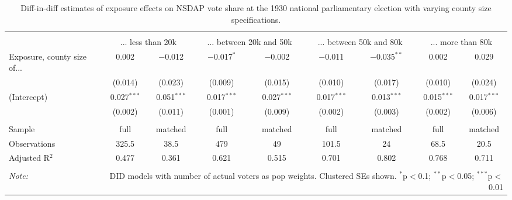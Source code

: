 
\begin{table}[!htbp] \centering 
  \caption{Diff-in-diff estimates of exposure effects on NSDAP vote share at the 1930 national parliamentary election with varying county size specifications.\vspace{-.25cm}} 
  \label{tab:nsdap-voteshare-countysize-dd-1930} 
\scriptsize 
\begin{tabular}{@{\extracolsep{5pt}}lcccccccc} 
\\[-1.8ex]\hline 
\hline \\[-1.8ex] 
 & \multicolumn{2}{c}{... less than 20k } & \multicolumn{2}{c}{... between 20k and 50k} & \multicolumn{2}{c}{... between 50k and 80k} & \multicolumn{2}{c}{... more than 80k} \\ 
 \cmidrule(r){2-3}\cmidrule(r){4-5}\cmidrule(r){6-7}\cmidrule(r){8-9}Exposure, county size of... & 0.002 & $-$0.012 & $-$0.017$^{*}$ & $-$0.002 & $-$0.011 & $-$0.035$^{**}$ & 0.002 & 0.029 \\ 
  & (0.014) & (0.023) & (0.009) & (0.015) & (0.010) & (0.017) & (0.010) & (0.024) \\ 
  (Intercept) & 0.027$^{***}$ & 0.051$^{***}$ & 0.017$^{***}$ & 0.027$^{***}$ & 0.017$^{***}$ & 0.013$^{***}$ & 0.015$^{***}$ & 0.017$^{***}$ \\ 
  & (0.002) & (0.011) & (0.001) & (0.009) & (0.002) & (0.003) & (0.002) & (0.006) \\ 
 \hline \\[-1.8ex] 
Sample & full & matched & full & matched & full & matched & full & matched \\ 
Observations & 325.5 & 38.5 & 479 & 49 & 101.5 & 24 & 68.5 & 20.5 \\ 
Adjusted R$^{2}$ & 0.477 & 0.361 & 0.621 & 0.515 & 0.701 & 0.802 & 0.768 & 0.711 \\ 
\hline 
\hline \\[-1.8ex] 
\textit{Note:}  & \multicolumn{8}{r}{DID models with number of actual voters as pop weights. Clustered SEs shown. $^{*}$p$<$0.1; $^{**}$p$<$0.05; $^{***}$p$<$0.01} \\ 
\end{tabular} 
\end{table} 
